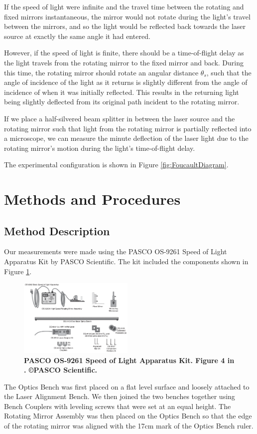 \documentclass[twocolumn]{article}
\begin{document}
		If the speed of light were infinite and the travel time between the rotating and fixed mirrors instantaneous, the mirror would not rotate during the light's travel between the mirrors, and so the light would be reflected back towards the laser source at exactly the same angle it had entered.
		
		However, if the speed of light is finite, there should be a time-of-flight delay as the light travels from the rotating mirror to the fixed mirror and back.
		During this time, the rotating mirror should rotate an angular distance $\theta_s$, such that the angle of incidence of the light as it returns is slightly different from the angle of incidence of when it was initially reflected.
		This results in the returning light being slightly deflected from its original path incident to the rotating mirror.
		
		If we place a half-silvered beam splitter in between the laser source and the rotating mirror such that light from the rotating mirror is partially reflected into a microscope, we can measure the minute deflection of the laser light due to the rotating mirror's motion during the light's time-of-flight delay.
		
		The experimental configuration is shown in Figure \ref{fig:FoucaultDiagram}.
		
\section{Methods and Procedures}
	\label{sec:Methods}
	\subsection{Method Description}
		Our measurements were made using the PASCO OS-9261 Speed of Light Apparatus Kit by PASCO Scientific.
		The kit included the components shown in Figure \ref{fig:LabEquip}.
		\begin{figure}[!ht]
			\centering
			\includegraphics[width=0.49\textwidth]{Images/PASCO_Equipment.png}
			\caption{\textbf{PASCO OS-9261 Speed of Light Apparatus Kit. Figure 4 in \cite{lee_instruction_????}. \copyright PASCO Scientific.}}
			\label{fig:LabEquip}
		\end{figure}
		The Optics Bench was first placed on a flat level surface and loosely attached to the Laser Alignment Bench.  
		We then joined the two benches together using Bench Couplers with leveling screws that were set at an equal height.  
		The Rotating Mirror Assembly was then placed on the Optics Bench so that the edge of the rotating mirror was aligned with the 17cm mark of the Optics Bench ruler.
		
\end{document}
